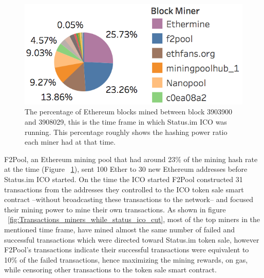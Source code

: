 \begin{figure}[h]
\centering
\includegraphics[width=0.5\linewidth]{figures/Mining_pool_ratio.png}
\caption{The percentage of Ethereum blocks mined between block 3903900 and 3908029, this is the time frame in which Status.im ICO was running. This percentage roughly shows the hashing power ratio each miner had at that time. \label{fig:mining_pool_ratio}} %
\end{figure}

F2Pool, an Ethereum mining pool that had around 23\% of the mining hash rate at the time (Figure ~\ref{fig:mining_pool_ratio}), sent 100 Ether to 30 new Ethereum addresses before Status.im ICO started. On the time the ICO started F2Pool constructed 31 transactions from the addresses they controlled to the ICO token sale smart contract --without broadcasting these transactions to the network-- and focused their mining power to mine their own transactions.
As shown in figure  ~\ref{fig:Transactions_miners_while_status_ico_cut}, most of the top miners in the mentioned time frame, have mined almost the same number of failed and successful transactions which were directed toward Status.im token sale, however F2Pool's transactions indicate their successful transactions were equivalent to 10\% of the failed transactions, hence maximizing the mining rewards, on gas, while censoring other transactions to the token sale smart contract.


